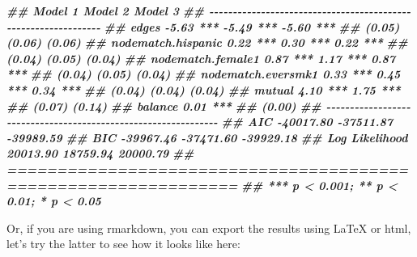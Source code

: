 \documentclass[
]{book}
\newenvironment{Shaded}{\begin{snugshade}}{\end{snugshade}}
\newcommand{\DocumentationTok}[1]{\textcolor[rgb]{0.56,0.35,0.01}{\textbf{\textit{#1}}}}
\begin{document}
\begin{Shaded}
\begin{Highlighting}[]
\DocumentationTok{\#\#                     Model 1        Model 2        Model 3      }
\DocumentationTok{\#\# {-}{-}{-}{-}{-}{-}{-}{-}{-}{-}{-}{-}{-}{-}{-}{-}{-}{-}{-}{-}{-}{-}{-}{-}{-}{-}{-}{-}{-}{-}{-}{-}{-}{-}{-}{-}{-}{-}{-}{-}{-}{-}{-}{-}{-}{-}{-}{-}{-}{-}{-}{-}{-}{-}{-}{-}{-}{-}{-}{-}{-}{-}{-}}
\DocumentationTok{\#\# edges                   {-}5.63 ***      {-}5.49 ***      {-}5.60 ***}
\DocumentationTok{\#\#                         (0.05)         (0.06)         (0.06)   }
\DocumentationTok{\#\# nodematch.hispanic       0.22 ***       0.30 ***       0.22 ***}
\DocumentationTok{\#\#                         (0.04)         (0.05)         (0.04)   }
\DocumentationTok{\#\# nodematch.female1        0.87 ***       1.17 ***       0.87 ***}
\DocumentationTok{\#\#                         (0.04)         (0.05)         (0.04)   }
\DocumentationTok{\#\# nodematch.eversmk1       0.33 ***       0.45 ***       0.34 ***}
\DocumentationTok{\#\#                         (0.04)         (0.04)         (0.04)   }
\DocumentationTok{\#\# mutual                   4.10 ***                      1.75 ***}
\DocumentationTok{\#\#                         (0.07)                        (0.14)   }
\DocumentationTok{\#\# balance                                                0.01 ***}
\DocumentationTok{\#\#                                                       (0.00)   }
\DocumentationTok{\#\# {-}{-}{-}{-}{-}{-}{-}{-}{-}{-}{-}{-}{-}{-}{-}{-}{-}{-}{-}{-}{-}{-}{-}{-}{-}{-}{-}{-}{-}{-}{-}{-}{-}{-}{-}{-}{-}{-}{-}{-}{-}{-}{-}{-}{-}{-}{-}{-}{-}{-}{-}{-}{-}{-}{-}{-}{-}{-}{-}{-}{-}{-}{-}}
\DocumentationTok{\#\# AIC                 {-}40017.80      {-}37511.87      {-}39989.59    }
\DocumentationTok{\#\# BIC                 {-}39967.46      {-}37471.60      {-}39929.18    }
\DocumentationTok{\#\# Log Likelihood       20013.90       18759.94       20000.79    }
\DocumentationTok{\#\# ===============================================================}
\DocumentationTok{\#\# *** p \textless{} 0.001; ** p \textless{} 0.01; * p \textless{} 0.05}
\end{Highlighting}
\end{Shaded}

Or, if you are using rmarkdown, you can export the results using LaTeX or html, let's try the latter to see how it looks like here:
\end{document}
